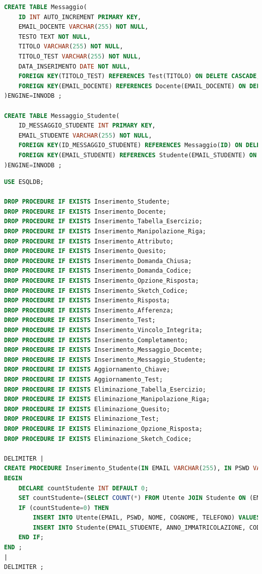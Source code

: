 \documentclass{article}
\begin{document}
\begin{lstlisting}[language=SQL, title=Codice SQL completo dello schema della base di dati.]
CREATE TABLE Messaggio(
    ID INT AUTO_INCREMENT PRIMARY KEY,
    EMAIL_DOCENTE VARCHAR(255) NOT NULL,
    TESTO TEXT NOT NULL,
    TITOLO VARCHAR(255) NOT NULL,
    TITOLO_TEST VARCHAR(255) NOT NULL,
    DATA_INSERIMENTO DATE NOT NULL,
    FOREIGN KEY(TITOLO_TEST) REFERENCES Test(TITOLO) ON DELETE CASCADE,
    FOREIGN KEY(EMAIL_DOCENTE) REFERENCES Docente(EMAIL_DOCENTE) ON DELETE CASCADE
)ENGINE=INNODB ;

CREATE TABLE Messaggio_Studente(
    ID_MESSAGGIO_STUDENTE INT PRIMARY KEY,
    EMAIL_STUDENTE VARCHAR(255) NOT NULL,
    FOREIGN KEY(ID_MESSAGGIO_STUDENTE) REFERENCES Messaggio(ID) ON DELETE CASCADE,
    FOREIGN KEY(EMAIL_STUDENTE) REFERENCES Studente(EMAIL_STUDENTE) ON DELETE CASCADE
)ENGINE=INNODB ;
\end{lstlisting}

\begin{lstlisting}[language=SQL, title=Codice SQL completo delle stored procedure dello schema della basi di dati.]
USE ESQLDB;

DROP PROCEDURE IF EXISTS Inserimento_Studente;
DROP PROCEDURE IF EXISTS Inserimento_Docente;
DROP PROCEDURE IF EXISTS Inserimento_Tabella_Esercizio;
DROP PROCEDURE IF EXISTS Inserimento_Manipolazione_Riga;
DROP PROCEDURE IF EXISTS Inserimento_Attributo;
DROP PROCEDURE IF EXISTS Inserimento_Quesito;
DROP PROCEDURE IF EXISTS Inserimento_Domanda_Chiusa;
DROP PROCEDURE IF EXISTS Inserimento_Domanda_Codice;
DROP PROCEDURE IF EXISTS Inserimento_Opzione_Risposta;
DROP PROCEDURE IF EXISTS Inserimento_Sketch_Codice;
DROP PROCEDURE IF EXISTS Inserimento_Risposta;
DROP PROCEDURE IF EXISTS Inserimento_Afferenza;
DROP PROCEDURE IF EXISTS Inserimento_Test;
DROP PROCEDURE IF EXISTS Inserimento_Vincolo_Integrita;
DROP PROCEDURE IF EXISTS Inserimento_Completamento;
DROP PROCEDURE IF EXISTS Inserimento_Messaggio_Docente;
DROP PROCEDURE IF EXISTS Inserimento_Messaggio_Studente;
DROP PROCEDURE IF EXISTS Aggiornamento_Chiave;
DROP PROCEDURE IF EXISTS Aggiornamento_Test;
DROP PROCEDURE IF EXISTS Eliminazione_Tabella_Esercizio;
DROP PROCEDURE IF EXISTS Eliminazione_Manipolazione_Riga;
DROP PROCEDURE IF EXISTS Eliminazione_Quesito;
DROP PROCEDURE IF EXISTS Eliminazione_Test;
DROP PROCEDURE IF EXISTS Eliminazione_Opzione_Risposta;
DROP PROCEDURE IF EXISTS Eliminazione_Sketch_Codice;

DELIMITER |
CREATE PROCEDURE Inserimento_Studente(IN EMAIL VARCHAR(255), IN PSWD VARCHAR(255), IN NOME VARCHAR(255), IN COGNOME VARCHAR(255), IN TELEFONO INT(10), IN ANNO_IMMATRICOLAZIONE INT(4), IN CODICE VARCHAR(16))
BEGIN
	DECLARE countStudente INT DEFAULT 0;
	SET countStudente=(SELECT COUNT(*) FROM Utente JOIN Studente ON (EMAIL=EMAIL_STUDENTE) WHERE (Utente.EMAIL=EMAIL));
	IF (countStudente=0) THEN 
		INSERT INTO Utente(EMAIL, PSWD, NOME, COGNOME, TELEFONO) VALUES (EMAIL, PSWD, NOME, COGNOME, TELEFONO);
		INSERT INTO Studente(EMAIL_STUDENTE, ANNO_IMMATRICOLAZIONE, CODICE) VALUES (EMAIL, ANNO_IMMATRICOLAZIONE, CODICE);
	END IF;   
END ;
| 
DELIMITER ;


\end{lstlisting}
\end{document}
